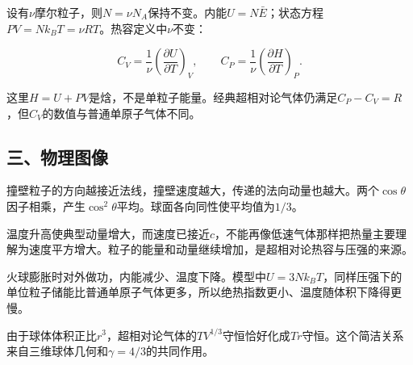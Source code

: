 \documentclass[12pt,a4paper,fontset=fandol]{ctexart}
\begin{document}
设有\(\nu\)摩尔粒子，则\(N=\nu N_A\)保持不变。内能\(U=N\bar E\)；状态方程\(PV=Nk_BT=\nu RT\)。热容定义中\(\nu\)不变：

\[
C_V=\frac1\nu\left(\frac{\partial U}{\partial T}\right)_V,
\qquad
C_P=\frac1\nu\left(\frac{\partial H}{\partial T}\right)_P.
\]

这里\(H=U+PV\)是焓，不是单粒子能量。经典超相对论气体仍满足\(C_P-C_V=R\)，但\(C_V\)的数值与普通单原子气体不同。

\subsection{三、物理图像}\label{ux4e09ux7269ux7406ux56feux50cf-6}

撞壁粒子的方向越接近法线，撞壁速度越大，传递的法向动量也越大。两个\(\cos\theta\)因子相乘，产生\(\cos^2\theta\)平均。球面各向同性使平均值为\(1/3\)。

\begin{center}
\begin{minipage}{\linewidth}
\centering\begingroup{}
\ifdim\wd\diagrambox>.88\linewidth
\sbox{\diagrambox}{\resizebox{.88\linewidth}{!}{\usebox{\diagrambox}}}\fi
\ifdim\ht\diagrambox>.38\textheight
\resizebox{!}{.38\textheight}{\usebox{\diagrambox}}
\else\usebox{\diagrambox}\fi
\par{}\endgroup\end{minipage}\end{center}

温度升高使典型动量增大，而速度已接近\(c\)，不能再像低速气体那样把热量主要理解为速度平方增大。粒子的能量和动量继续增加，是超相对论热容与压强的来源。

火球膨胀时对外做功，内能减少、温度下降。模型中\(U=3Nk_BT\)，同样压强下的单位粒子储能比普通单原子气体更多，所以绝热指数更小、温度随体积下降得更慢。

由于球体体积正比\(r^3\)，超相对论气体的\(TV^{1/3}\)守恒恰好化成\(Tr\)守恒。这个简洁关系来自三维球体几何和\(\gamma=4/3\)的共同作用。
\end{document}
